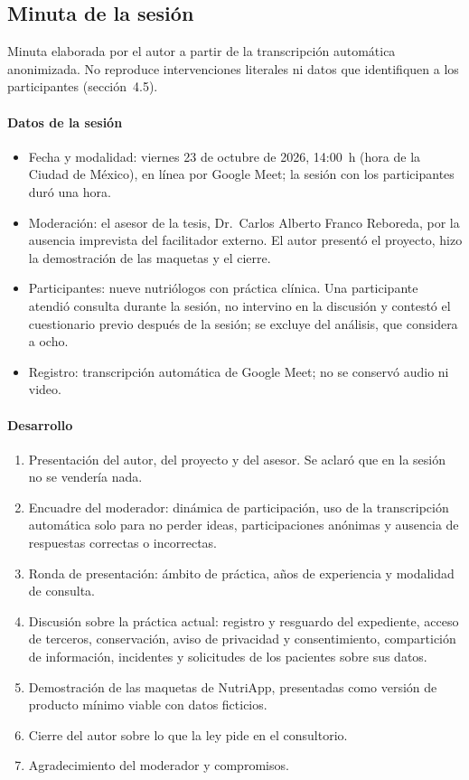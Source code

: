 \documentclass[12pt, a4paper]{article}
\begin{document}
\subsection{Minuta de la sesión}
\label{anexo:minuta}

Minuta elaborada por el autor a partir de la transcripción automática anonimizada. No reproduce intervenciones literales ni datos que identifiquen a los participantes (sección~4.5).

\paragraph{Datos de la sesión}
\begin{itemize}[leftmargin=*,itemsep=1pt]
  \item Fecha y modalidad: viernes 23 de octubre de 2026, 14:00~h (hora de la Ciudad de México), en línea por Google Meet; la sesión con los participantes duró una hora.
  \item Moderación: el asesor de la tesis, Dr.~Carlos Alberto Franco Reboreda, por la ausencia imprevista del facilitador externo. El autor presentó el proyecto, hizo la demostración de las maquetas y el cierre.
  \item Participantes: nueve nutriólogos con práctica clínica. Una participante atendió consulta durante la sesión, no intervino en la discusión y contestó el cuestionario previo después de la sesión; se excluye del análisis, que considera a ocho.
  \item Registro: transcripción automática de Google Meet; no se conservó audio ni video.
\end{itemize}

\paragraph{Desarrollo}
\begin{enumerate}[leftmargin=*,itemsep=1pt]
  \item Presentación del autor, del proyecto y del asesor. Se aclaró que en la sesión no se vendería nada.
  \item Encuadre del moderador: dinámica de participación, uso de la transcripción automática solo para no perder ideas, participaciones anónimas y ausencia de respuestas correctas o incorrectas.
  \item Ronda de presentación: ámbito de práctica, años de experiencia y modalidad de consulta.
  \item Discusión sobre la práctica actual: registro y resguardo del expediente, acceso de terceros, conservación, aviso de privacidad y consentimiento, compartición de información, incidentes y solicitudes de los pacientes sobre sus datos.
  \item Demostración de las maquetas de NutriApp, presentadas como versión de producto mínimo viable con datos ficticios.
  \item Cierre del autor sobre lo que la ley pide en el consultorio.
  \item Agradecimiento del moderador y compromisos.
\end{enumerate}
\end{document}
